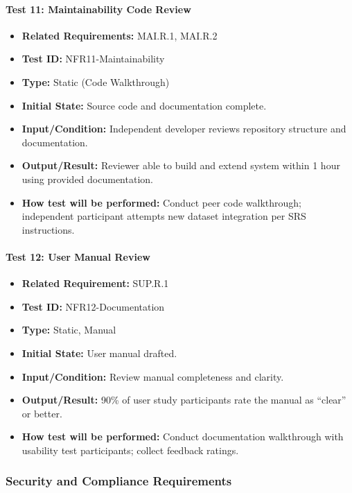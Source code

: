 \documentclass[12pt, titlepage]{article}
\begin{document}
\paragraph{Test 11: Maintainability Code Review}
\begin{itemize}
    \item \textbf{Related Requirements:} MAI.R.1, MAI.R.2
    \item \textbf{Test ID:} NFR11-Maintainability
    \item \textbf{Type:} Static (Code Walkthrough)
    \item \textbf{Initial State:} Source code and documentation complete.
    \item \textbf{Input/Condition:} Independent developer reviews repository structure and documentation.
    \item \textbf{Output/Result:} Reviewer able to build and extend system within 1 hour using provided documentation.
    \item \textbf{How test will be performed:} Conduct peer code walkthrough; independent participant attempts new dataset integration per SRS instructions.
\end{itemize}

\paragraph{Test 12: User Manual Review}
\begin{itemize}
    \item \textbf{Related Requirement:} SUP.R.1
    \item \textbf{Test ID:} NFR12-Documentation
    \item \textbf{Type:} Static, Manual
    \item \textbf{Initial State:} User manual drafted.
    \item \textbf{Input/Condition:} Review manual completeness and clarity.
    \item \textbf{Output/Result:} 90\% of user study participants rate the manual as “clear” or better.
    \item \textbf{How test will be performed:} Conduct documentation walkthrough with usability test participants; collect feedback ratings.
\end{itemize}

\subsubsection{Security and Compliance Requirements}
\end{document}
